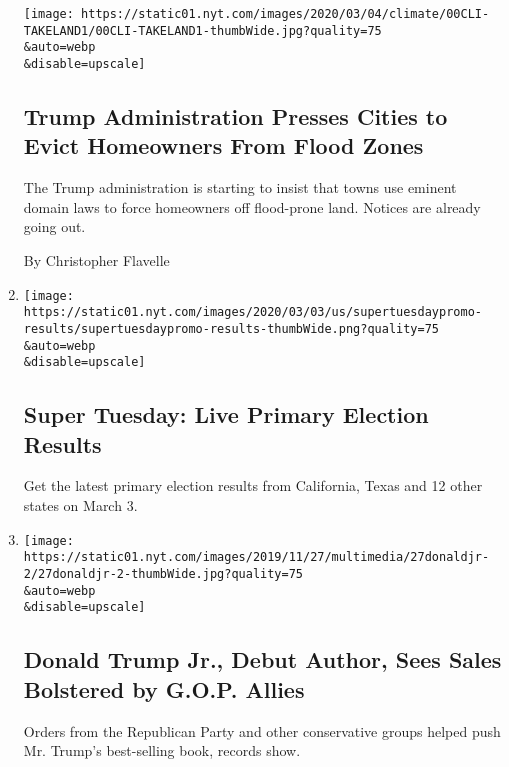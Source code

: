 \begin{enumerate}
  \texttt{[image: https://static01.nyt.com/images/2020/03/04/climate/00CLI-TAKELAND1/00CLI-TAKELAND1-thumbWide.jpg?quality=75\\\&auto=webp\\\&disable=upscale]}

  \hypertarget{trump-administration-presses-cities-to-evict-homeowners-from-flood-zones}{%
  \subsection{Trump Administration Presses Cities to Evict Homeowners
  From Flood
  Zones}\label{trump-administration-presses-cities-to-evict-homeowners-from-flood-zones}}

  The Trump administration is starting to insist that towns use eminent
  domain laws to force homeowners off flood-prone land. Notices are
  already going out.~

  By Christopher Flavelle
\item
  \href{/interactive/2020/03/03/us/elections/results-super-tuesday-primary-election.html}{}

  \texttt{[image: https://static01.nyt.com/images/2020/03/03/us/supertuesdaypromo-results/supertuesdaypromo-results-thumbWide.png?quality=75\\\&auto=webp\\\&disable=upscale]}

  \hypertarget{super-tuesday-live-primary-election-results}{%
  \subsection{Super Tuesday: Live Primary Election
  Results}\label{super-tuesday-live-primary-election-results}}

  Get the latest primary election results from California, Texas and 12
  other states on March 3.
\item
  \href{/2019/11/28/us/politics/donald-trump-jr-book.html}{}

  \texttt{[image: https://static01.nyt.com/images/2019/11/27/multimedia/27donaldjr-2/27donaldjr-2-thumbWide.jpg?quality=75\\\&auto=webp\\\&disable=upscale]}

  \hypertarget{donald-trump-jr-debut-author-sees-sales-bolstered-by-gop-allies}{%
  \subsection{Donald Trump Jr., Debut Author, Sees Sales Bolstered by
  G.O.P.
  Allies}\label{donald-trump-jr-debut-author-sees-sales-bolstered-by-gop-allies}}

  Orders from the Republican Party and other conservative groups helped
  push Mr. Trump's best-selling book, records show.


\end{enumerate}
